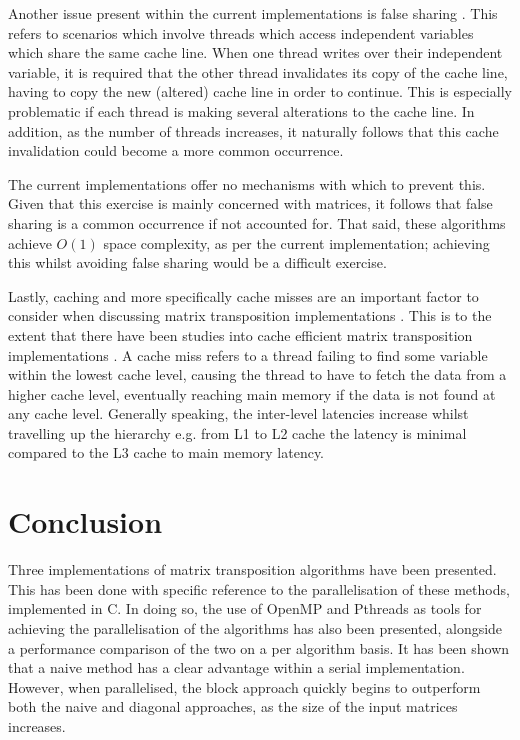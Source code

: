 \documentclass[journal,10pt]{IEEEtran}
\begin{document}
Another issue present within the current implementations is false sharing \cite{false}. This refers to scenarios which involve threads which access independent variables which share the same cache line. When one thread writes over their independent variable, it is required that the other thread invalidates its copy of the cache line, having to copy the new (altered) cache line in order to continue. This is especially problematic if each thread is making several alterations to the cache line. In addition, as the number of threads increases, it naturally follows that this cache invalidation could become a more common occurrence. 

The current implementations offer no mechanisms with which to prevent this. Given that this exercise is mainly concerned with matrices, it follows that false sharing is a common occurrence if not accounted for. That said, these algorithms achieve $O(1)$ space complexity, as per the current implementation; achieving this whilst avoiding false sharing would be a difficult exercise.

Lastly, caching and more specifically cache misses are an important factor to consider when discussing matrix transposition implementations \cite{cmiss}. This is to the extent that there have been studies into cache efficient matrix transposition implementations \cite{c1,c2}. A cache miss refers to a thread failing to find some variable within the lowest cache level, causing the thread to have to fetch the data from a higher cache level, eventually reaching main memory if the data is not found at any cache level. Generally speaking, the inter-level latencies increase whilst travelling up the hierarchy e.g. from L1 to L2 cache the latency is minimal compared to the L3 cache to main memory latency. %


\clearpage
\section{Conclusion}
Three implementations of matrix transposition algorithms have been presented. This has been done with specific reference to the parallelisation of these methods, implemented in C. In doing so, the use of OpenMP and Pthreads as tools for achieving the parallelisation of the algorithms has also been presented, alongside a performance comparison of the two on a per algorithm basis. It has been shown that a naive method has a clear advantage within a serial implementation. However, when parallelised, the block approach quickly begins to outperform both the naive and diagonal approaches, as the size of the input matrices increases.
\end{document}
